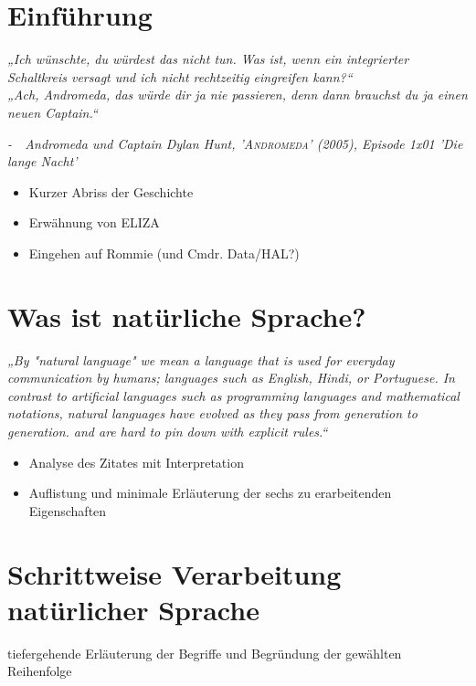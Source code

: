 \documentclass[12pt,twoside]{article}
\theoremstyle{plain}
\theoremstyle{definition}
\theoremstyle{remark}
\begin{document}
\setcounter{tocdepth}{2} 					%
\tableofcontents
{}
\clearpage



\section{Einführung}
\label{sec:intro}
	\textit{„Ich wünschte, du würdest das nicht tun.
	Was ist, wenn ein integrierter Schaltkreis versagt und ich nicht rechtzeitig eingreifen kann?“\\
	„Ach, Andromeda, das würde dir ja nie passieren, denn dann brauchst du ja einen neuen Captain.“}
	\begin{flushright}
		\textit{-~~Andromeda und Captain Dylan Hunt, \textsc{'Andromeda'} (2005), Episode 1x01 'Die lange Nacht'}
	\end{flushright}
	\begin{itemize}
	    \item Kurzer Abriss der Geschichte
	    \item Erwähnung von ELIZA
	    \item Eingehen auf Rommie (und Cmdr. Data/HAL?)
	\end{itemize}

\section{Was ist natürliche Sprache?}
\label{sec:def_lang}
\textit{„By "natural language" we mean a language that is used for everyday communication by humans; languages such as English, Hindi, or Portuguese.
        In contrast to artificial languages such as programming languages and mathematical notations, natural languages have evolved as they pass from generation to generation.
        and are hard to pin down with explicit rules.“} \cite{Bird2009}
\begin{itemize}
    \item Analyse des Zitates mit Interpretation
    \item Auflistung und minimale Erläuterung der sechs zu erarbeitenden Eigenschaften
\end{itemize}

\section{Schrittweise Verarbeitung natürlicher Sprache}
\label{sec:meth}
tiefergehende Erläuterung der Begriffe und Begründung der gewählten Reihenfolge
\end{document}
